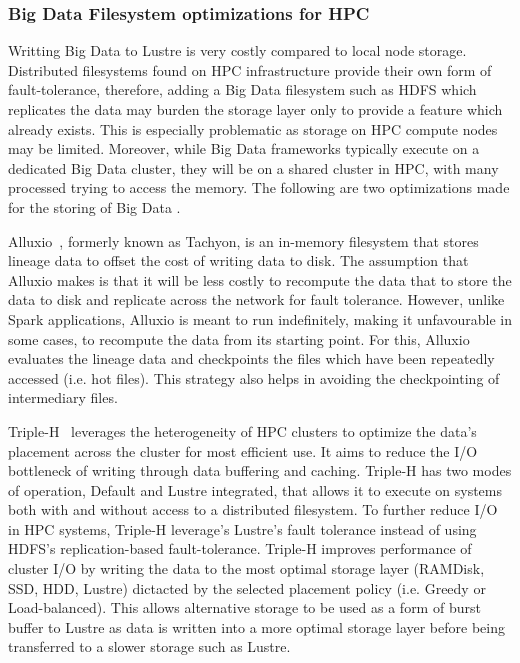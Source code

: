             \subsubsection{Big Data Filesystem optimizations for HPC}

                Writting Big Data to Lustre is very costly compared to local
                node storage. Distributed filesystems found on HPC
                infrastructure provide their own form of fault-tolerance,
                therefore, adding a Big Data filesystem such as HDFS which
                replicates the data may burden the storage layer only to provide
                a feature which already exists. This is especially problematic
                as storage on HPC compute nodes may be limited. Moreover, while
                Big Data frameworks typically execute on a dedicated Big Data
                cluster, they will be on a shared cluster in HPC, with many
                processed trying to access the memory. The following are two
                optimizations made for the storing of Big Data .

                Alluxio~\cite{Li:2014:TRM:2670979.2670985}, formerly known as
                Tachyon, is an in-memory filesystem that stores lineage data to
                offset the cost of writing data to disk. The assumption that
                Alluxio makes is that it will be less costly to recompute the
                data that to store the data to disk and replicate across the
                network for fault tolerance. However, unlike Spark applications,
                Alluxio is meant to run indefinitely, making it unfavourable in
                some cases, to recompute the data from its starting point. For
                this, Alluxio evaluates the lineage data and checkpoints the
                files which have been repeatedly accessed (i.e. hot files). This
                strategy also helps in avoiding the checkpointing of
                intermediary files. 

                Triple-H~\cite{7152476} leverages the heterogeneity of HPC
                clusters to optimize the data's placement across the cluster for
                most efficient use. It aims to reduce the I/O bottleneck of
                writing through data buffering and caching. Triple-H has two
                modes of operation, Default and Lustre integrated, that allows
                it to execute on systems both with and without access to a
                distributed filesystem. To further reduce I/O in HPC systems,
                Triple-H leverage's Lustre's fault tolerance instead of using
                HDFS's replication-based fault-tolerance. Triple-H improves
                performance of cluster I/O by writing the data to the most
                optimal storage layer (RAMDisk, SSD, HDD, Lustre) dictacted by
                the selected placement policy (i.e. Greedy or Load-balanced).
                This allows alternative storage to be used as a form of burst
                buffer to Lustre as data is written into a more optimal storage
                layer before being transferred to a slower storage such as
                Lustre. 

